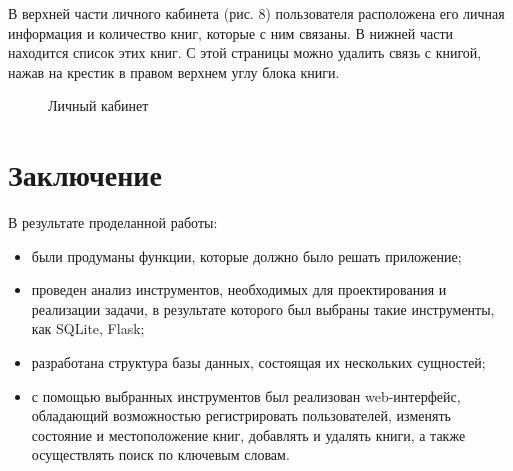 \documentclass[12pt]{article}
\begin{document}
В верхней части личного кабинета (рис. 8) пользователя расположена его личная информация  и количество книг, которые с ним связаны. В нижней части находится список этих книг. С этой страницы можно удалить связь с книгой, нажав на крестик в правом верхнем углу блока книги.

\begin{figure}[H]
	\caption{Личный кабинет}
	\label{fig:image}
\end{figure}

\newpage
\section*{Заключение}%

В результате проделанной работы:
\begin{itemize}
	\item были продуманы функции, которые должно было решать приложение;
	\item проведен анализ инструментов, необходимых для проектирования и реализации задачи, в результате которого был выбраны такие инструменты, как SQLite, Flask;
	\item разработана структура базы данных, состоящая их нескольких сущностей;
	\item с помощью выбранных инструментов был реализован web-интерфейс, обладающий возможностью регистрировать пользователей, изменять состояние и местоположение книг, добавлять и удалять книги, а также осуществлять поиск по ключевым словам.
\end{itemize}
\end{document}
